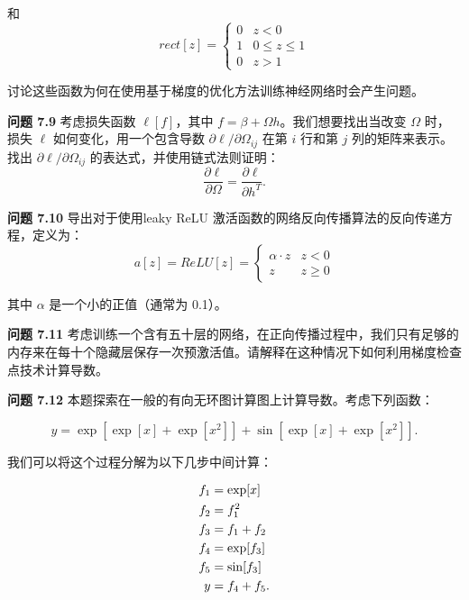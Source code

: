 \documentclass[lang=cn,newtx,10pt,scheme=chinese]{elegantbook}
\begin{document}
和
\begin{equation}
rect[z] = \begin{cases}
0 & z < 0 \\
1 & 0 \leq z \leq 1 \\
0 & z > 1
\end{cases} 
\end{equation}

讨论这些函数为何在使用基于梯度的优化方法训练神经网络时会产生问题。

\textbf{问题 7.9} 考虑损失函数 \(\ell[f]\)，其中 \(f = \beta + \Omega h\)。我们想要找出当改变 \(\Omega\) 时，损失 \(\ell\) 如何变化，用一个包含导数 \(\partial\ell/\partial\Omega_{ij}\) 在第 \(i\) 行和第 \(j\) 列的矩阵来表示。找出 \(\partial\ell/\partial\Omega_{ij}\) 的表达式，并使用链式法则证明：
\begin{equation}
\frac{\partial \ell}{\partial \Omega} = \frac{\partial \ell}{\partial h^T}. 
\end{equation}

\textbf{问题 7.10} 导出对于使用leaky ReLU 激活函数的网络反向传播算法的反向传递方程，定义为：
\begin{equation}
a[z] = ReLU[z] = \begin{cases}
\alpha \cdot z & z < 0 \\
z & z \geq 0
\end{cases} 
\end{equation}

其中 \(\alpha\) 是一个小的正值（通常为 0.1）。

\textbf{问题 7.11} 考虑训练一个含有五十层的网络，在正向传播过程中，我们只有足够的内存来在每十个隐藏层保存一次预激活值。请解释在这种情况下如何利用梯度检查点技术计算导数。

\textbf{问题 7.12} 本题探索在一般的有向无环图计算图上计算导数。考虑下列函数：

\begin{equation}
y = \exp [\exp[x] + \exp[x^2]] + \sin[\exp[x] + \exp[x^2]]. 
\end{equation}

我们可以将这个过程分解为以下几步中间计算：

\begin{align}
f_1 &= \exp[x] \notag \\
f_2 &= f_1^2 \notag \\
f_3 &= f_1 + f_2 \notag \\
f_4 &= \exp[f_3] \notag \\
f_5 &= \sin[f_3] \notag \\
y &= f_4 + f_5.
\end{align} 
\end{document}
